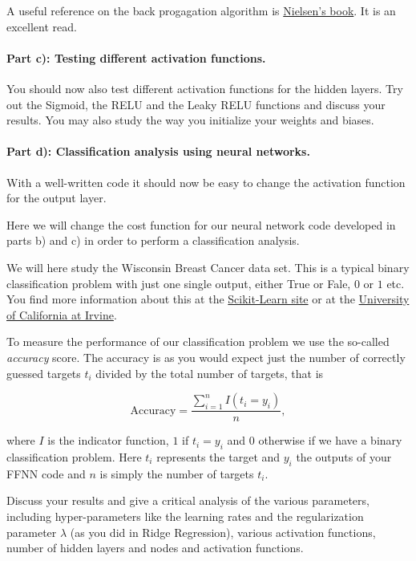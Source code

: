 \documentclass[%
oneside,                 %
final,                   %
10pt]{article}
\begin{document}
A useful reference on the back progagation algorithm is \href{{http://neuralnetworksanddeeplearning.com/}}{Nielsen's
book}. It is an excellent
read.

\paragraph{Part c): Testing different activation functions.}
You should now also test different activation functions for the hidden layers. Try out the Sigmoid, the RELU and the Leaky RELU functions and discuss your results. You may also study the way you initialize your weights and biases.

\paragraph{Part d): Classification  analysis using neural networks.}
With a well-written code it should now be easy to change the
activation function for the output layer.

Here we will change the cost function for our neural network code
developed in parts b) and c) in order to perform a classification analysis. 

We will here study the Wisconsin Breast Cancer  data set. This is a typical binary classification problem with just one single output, either True or Fale, $0$ or $1$ etc.
You find more information about this at the \href{{https://scikit-learn.org/stable/modules/generated/sklearn.datasets.load_breast_cancer.html}}{Scikit-Learn
site} or at the \href{{https://archive.ics.uci.edu/ml/datasets/breast+cancer+wisconsin+(original)}}{University of California
at Irvine}. 

To measure the performance of our classification problem we use the
so-called \emph{accuracy} score.  The accuracy is as you would expect just
the number of correctly guessed targets $t_i$ divided by the total
number of targets, that is 

\[ 
\text{Accuracy} = \frac{\sum_{i=1}^n I(t_i = y_i)}{n} ,
\]

where $I$ is the indicator function, $1$ if $t_i = y_i$ and $0$
otherwise if we have a binary classification problem. Here $t_i$
represents the target and $y_i$ the outputs of your FFNN code and $n$ is simply the number of targets $t_i$.

Discuss your results and give a critical analysis of the various parameters, including hyper-parameters like the learning rates and the regularization parameter $\lambda$ (as you did in Ridge Regression), various activation functions, number of hidden layers and nodes and activation functions.  
\end{document}
